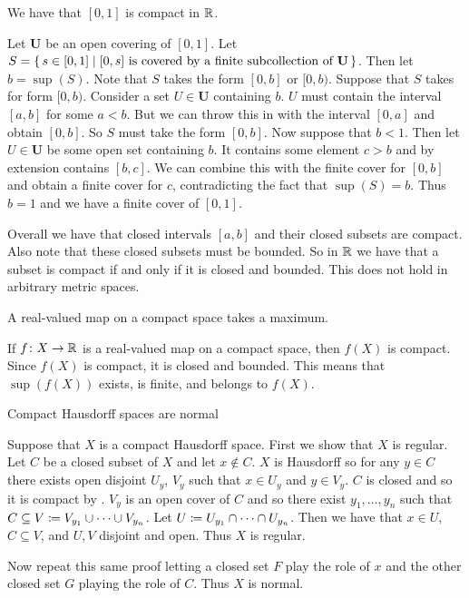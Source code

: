 \documentclass[letterpaper, 11pt, oneside]{book}
\begin{document}
\begin{ex}\label{ex: 01_compact}
  We have that $[0, 1]$ is compact in $\mathbb{R}$.
\end{ex}
\begin{pf}
  Let $\textbf{U}$ be an open covering of $[0, 1]$.
  Let $S = \set{s \in [0, 1] | [0, s] \text{ is covered by a finite subcollection of } \textbf{U}}$.
  Then let $b = \sup(S)$.
  Note that $S$ takes the form $[0, b]$ or $[0, b)$.
  Suppose that $S$ takes for form $[0, b)$.
  Consider a set $U \in \textbf{U}$ containing $b$.
  $U$ must contain the interval $[a, b]$ for some $a < b$.
  But we can throw this in with the interval $[0, a]$ and obtain $[0, b]$.
  So $S$ must take the form $[0, b]$.
  Now suppose that $b < 1$.
  Then let $U \in \textbf{U}$ be some open set containing $b$.
  It contains some element $c > b$ and by extension contains $[b, c]$.
  We can combine this with the finite cover for $[0, b]$ and obtain a finite cover for $c$, contradicting the fact that $\sup(S) = b$.
  Thus $b = 1$ and we have a finite cover of $[0, 1]$.
\end{pf}

Overall we have that closed intervals $[a, b]$ and their closed subsets are compact.
Also note that these closed subsets must be bounded.
So in $\mathbb{R}$ we have that a subset is compact if and only if it is closed and bounded.
This does not hold in arbitrary metric spaces.

\begin{thrm}
  A real-valued map on a compact space takes a maximum.
\end{thrm}
\begin{pf}
  If $f\colon X \to \mathbb{R}$ is a real-valued map on a compact space, then $f(X)$ is compact.
  Since $f(X)$ is compact, it is closed and bounded.
  This means that $\sup(f(X))$ exists, is finite, and belongs to $f(X)$.
\end{pf}

\begin{thrm}\label{thrm: compact_haus_is_norm}
  Compact Hausdorff spaces are normal
\end{thrm}
\begin{pf}
  Suppose that $X$ is a compact Hausdorff space.
  First we show that $X$ is regular.
  Let $C$ be a closed subset of $X$ and let $x \notin C$.
  $X$ is Hausdorff so for any $y \in C$ there exists open disjoint $U_{y}$, $V_{y}$ such that $x \in U_{y}$ and $y \in V_{y}$.
  $C$ is closed and so it is compact by .
  $V_{y}$ is an open cover of $C$ and so there exist $y_{1}, \ldots, y_{n}$ such that $C \subseteq V \coloneqq V_{y_{1}} \cup \cdots \cup V_{y_{n}}$.
  Let $U \coloneqq U_{y_{1}} \cap \cdots \cap U_{y_{n}}$.
  Then we have that $x \in U$, $C \subseteq V$, and $U, V$ disjoint and open.
  Thus $X$ is regular.

  Now repeat this same proof letting a closed set $F$ play the role of $x$ and the other closed set $G$ playing the role of $C$.
  Thus $X$ is normal.
\end{pf}
\end{document}
